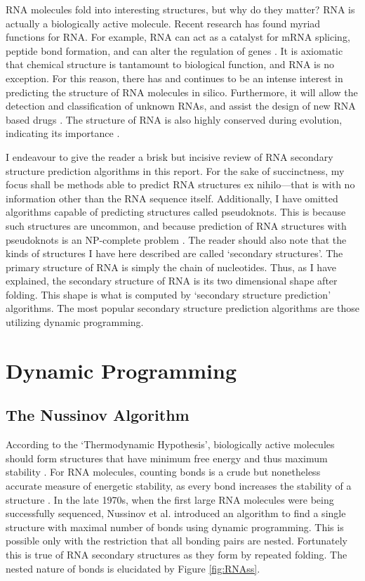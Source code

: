 \documentclass[12pt, a4paper]{article}
\begin{document}
RNA molecules fold into interesting structures, but why do they matter? RNA is actually a biologically active molecule. Recent research has found myriad functions for RNA. For example, RNA can act as a catalyst for mRNA splicing, peptide bond formation, and can alter the regulation of genes
\cite{xu2012statistical}. It is axiomatic that chemical structure is tantamount to biological function, and RNA is no exception. For this reason, there has and continues to be an intense
interest in predicting the structure of RNA
molecules in silico. Furthermore, it will allow the detection and classification of unknown RNAs, and assist the design of new RNA based drugs \cite{condon2003problems}. The structure of RNA
is also highly conserved during evolution, indicating its importance \cite{hofacker2008rna}.

I endeavour to give the reader a brisk but incisive review of RNA secondary structure prediction algorithms in this report. For the sake of succinctness, my focus shall be methods able to predict RNA structures ex nihilo---that is with no information other than the RNA sequence itself. Additionally, I have omitted algorithms capable of predicting structures called pseudoknots. This is because such structures are uncommon, and because prediction of RNA structures with pseudoknots is an NP-complete problem \cite{lyngso2000rna}. The reader should also note that the kinds of structures I have here described are called `secondary structures'. The primary structure of RNA is simply the chain of nucleotides. Thus, as I have explained, the secondary structure of RNA is its two dimensional shape after folding. This shape is what is computed by `secondary structure prediction' algorithms. The most popular secondary structure prediction algorithms are those utilizing dynamic programming.

\section{Dynamic Programming}
\subsection{The Nussinov Algorithm}
According to the `Thermodynamic Hypothesis', biologically active molecules should form structures that have minimum free energy and thus maximum stability \cite{anfinsen1973principles}. For RNA molecules, counting bonds is a crude but nonetheless accurate measure of energetic stability, as every bond increases the
stability of a structure \cite{nussinov1978algorithms}. In the late 1970s, when the first large RNA molecules
were being successfully sequenced, Nussinov et al. \cite{nussinov1978algorithms} introduced an algorithm to find a single structure with maximal number of bonds using dynamic programming. This is possible only with the restriction that all bonding pairs are nested. Fortunately this is true of RNA secondary structures as they form by repeated folding. The nested nature of bonds is elucidated by Figure \ref{fig:RNAss}.
\end{document}
